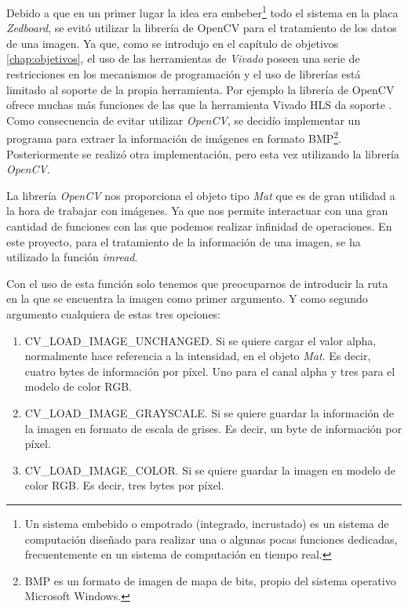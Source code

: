 Debido a que en un primer lugar la idea era embeber\footnote{Un sistema embebido o empotrado (integrado, incrustado) es un sistema de computación diseñado para realizar una o algunas pocas funciones dedicadas, frecuentemente en un sistema de computación en tiempo real.} todo el sistema en la placa \emph{Zedboard}, se evitó utilizar la librería de OpenCV para el tratamiento de los datos de una imagen. Ya que, como se introdujo en el capítulo de objetivos \ref{chap:objetivos}, el uso de las herramientas de \emph{Vivado} poseen una serie de restricciones en los mecanismos de programación y el uso de librerías está limitado al soporte de la propia herramienta. Por ejemplo la librería de OpenCV ofrece muchas más funciones de las que la herramienta Vivado HLS da soporte \cite{RestriccionesOpenCV}. Como consecuencia de evitar utilizar \emph{OpenCV}, se decidío implementar un programa para extraer la información de imágenes en formato \ac{BMP}\footnote{BMP es un formato de imagen de mapa de bits, propio del sistema operativo Microsoft Windows.}. Posteriormente se realizó otra implementación, pero esta vez utilizando la librería \emph{OpenCV}. 

La librería \emph{OpenCV} nos proporciona el objeto tipo \emph{Mat} que es de gran utilidad a la hora de trabajar con imágenes. Ya que nos permite interactuar con  una gran cantidad de funciones con las que podemos realizar infinidad de operaciones. \cite{Mat} En este proyecto, para el tratamiento de la información de una imagen, se ha utilizado la función \emph{imread}. \cite{ImRead}

Con el uso de esta función solo tenemos que preocuparnos de introducir la ruta en la que se encuentra la imagen como primer argumento. Y como segundo argumento cualquiera de estas tres opciones:

\begin{enumerate}
\item CV\_LOAD\_IMAGE\_UNCHANGED. Si se quiere cargar el valor alpha, normalmente hace referencia a la intensidad, en el objeto \emph{Mat}. Es decir, cuatro bytes de información por píxel. Uno para el canal alpha y tres para el modelo de color \ac{RGB}.
\item CV\_LOAD\_IMAGE\_GRAYSCALE. Si se quiere guardar la información de la imagen en formato de escala de grises. Es decir, un byte de información por píxel.
\item CV\_LOAD\_IMAGE\_COLOR. Si se quiere guardar la imagen en modelo de color \ac{RGB}. Es decir, tres bytes por píxel.
\end{enumerate}

